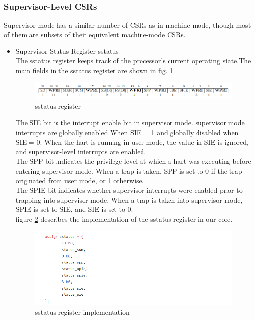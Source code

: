 \documentclass[../main.tex]{subfiles}
\begin{document}
\subsubsection{Supervisor-Level CSRs}
Supervisor-mode has a similar number of CSRs as in machine-mode, though most of them are subsets of their equivalent machine-mode CSRs.

\begin{itemize}
    \item Supervisor Status Register sstatus\\
        The sstatus register keeps track of the processor’s current operating state.The main fields in the sstatus register are shown in fig. \ref{fig:sstatus}
        \begin{figure}[h]
            \centering
            \includegraphics[width=10 cm]{diagrams/sstatus.png}
            \caption{sstatus register}
            \label{fig:sstatus}
        \end{figure}
        The SIE bit is the interrupt enable bit in supervisor mode. supervisor mode interrupts are globally enabled When SIE = 1 and globally disabled when SIE = 0. When the hart is running in user-mode, the value in SIE is ignored, and supervisor-level interrupts are enabled.\\
        The SPP bit indicates the privilege level at which a hart was executing before entering supervisor mode. When a trap is taken, SPP is set to 0 if the trap originated from user mode, or 1 otherwise.\\
        The SPIE bit indicates whether supervisor interrupts were enabled prior to trapping into supervisor mode. When a trap is taken into supervisor mode, SPIE is set to SIE, and SIE is set to 0.\\ figure \ref{fig:sstatus_imp}  describes the implementation of the sstatus register in our core.
        
        \begin{figure}[h]
            \centering
            \includegraphics[width=15 cm]{diagrams/sstatus_imp.png}
            \caption{sstatus register  implementation}
            \label{fig:sstatus_imp}
        \end{figure} \\
        

\end{itemize}
\end{document}
